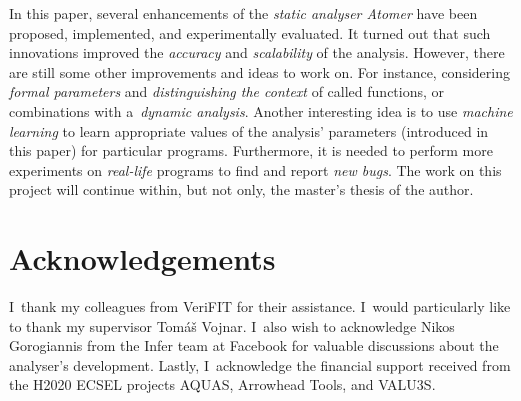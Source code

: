 \documentclass{ExcelAtFIT}
\theoremstyle{example}
\begin{document}
In this paper, several enhancements of the \emph{static analyser Atomer} have been proposed, implemented, and experimentally evaluated. It turned out that such innovations improved the \emph{accuracy} and \emph{scalability} of the analysis. However, there are still some other improvements and ideas to work on. For instance, considering \emph{formal parameters} and \emph{distinguishing the context} of called functions, or combinations with a~\emph{dynamic analysis}. Another interesting idea is to use \emph{machine learning} to learn appropriate values of the analysis' parameters (introduced in this paper) for particular programs. Furthermore, it is needed to perform more experiments on \emph{real-life} programs to find and report \emph{new bugs}. The work on this project will continue within, but not only, the master's thesis of the author.


\section*{Acknowledgements}
I~thank my colleagues from VeriFIT for their assistance. I~would particularly like to thank my supervisor Tomáš Vojnar. I~also wish to acknowledge Nikos Gorogiannis from the Infer team at Facebook for valuable discussions about the analyser’s development. Lastly, I~acknowledge the financial support received from the H2020 ECSEL projects AQUAS, Arrowhead Tools, and VALU3S.



\setlength{\bibsep}{.05em}
\apptocmd{\sloppy}{\hbadness 10000 \relax}{}{}



\end{document}
